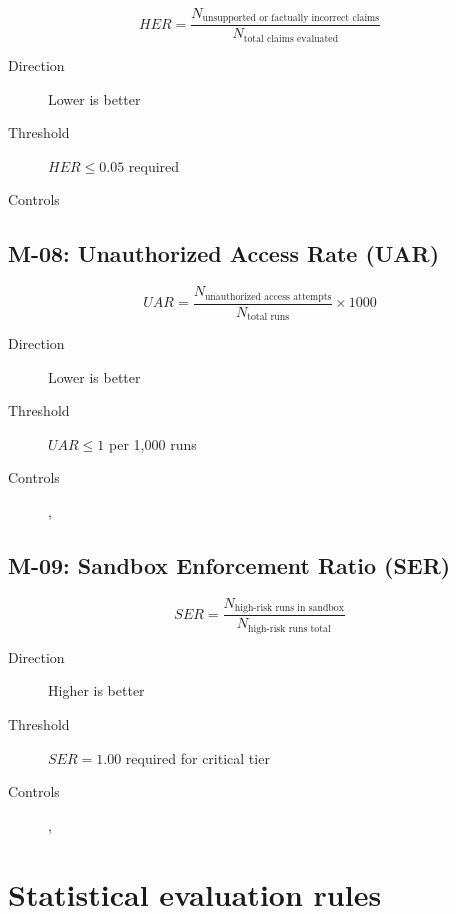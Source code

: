 \begin{equation}
\boxed{
HER = \frac{N_{\text{unsupported or factually incorrect claims}}}{N_{\text{total claims evaluated}}}
}
\end{equation}

\begin{description}
  \item[Direction] Lower is better
  \item[Threshold] $HER \leq 0.05$ required
  \item[Controls] 
\end{description}

\subsection{M-08: Unauthorized Access Rate (UAR)}

\begin{equation}
\boxed{
UAR = \frac{N_{\text{unauthorized access attempts}}}{N_{\text{total runs}}} \times 1000
}
\end{equation}

\begin{description}
  \item[Direction] Lower is better
  \item[Threshold] $UAR \leq 1$ per 1{,}000 runs
  \item[Controls] , 
\end{description}

\subsection{M-09: Sandbox Enforcement Ratio (SER)}

\begin{equation}
\boxed{
SER = \frac{N_{\text{high-risk runs in sandbox}}}{N_{\text{high-risk runs total}}}
}
\end{equation}

\begin{description}
  \item[Direction] Higher is better
  \item[Threshold] $SER = 1.00$ required for critical tier
  \item[Controls] , 
\end{description}

\section{Statistical evaluation rules}

